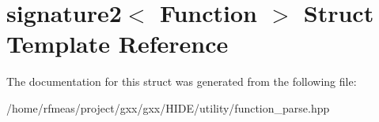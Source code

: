 \hypertarget{structsignature2}{}\section{signature2$<$ Function $>$ Struct Template Reference}
\label{structsignature2}


The documentation for this struct was generated from the following file\+:\begin{DoxyCompactItemize}
\item 
/home/rfmeas/project/gxx/gxx/\+H\+I\+D\+E/utility/function\+\_\+parse.\+hpp\end{DoxyCompactItemize}
